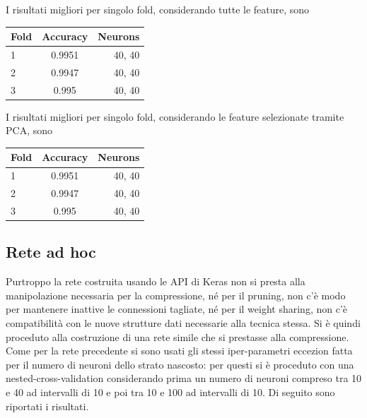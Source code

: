 \documentclass[12pt]{report}
\begin{document}
I risultati migliori per singolo fold, considerando tutte le feature, sono

\par\null\par

\begin{center}
\begin{tabular}{lcr}
\toprule
Fold & Accuracy & Neurons \\
\midrule
1  & 0.9951 & 40, 40\\
2  & 0.9947 & 40, 40\\
3  & 0.995 & 40, 40\\
\bottomrule
\end{tabular}
\end{center}

\par\null\par
\par\null\par

I risultati migliori per singolo fold, considerando le feature selezionate tramite PCA, sono

\par\null\par

\begin{center}
\begin{tabular}{lcr}
\toprule
Fold & Accuracy & Neurons \\
\midrule
1  & 0.9951 & 40, 40\\
2  & 0.9947 & 40, 40\\
3  & 0.995 & 40, 40\\
\bottomrule
\end{tabular}
\end{center}

\par\null\par
\par\null\par

\subsection{Rete ad hoc}
Purtroppo la rete costruita usando le API di Keras non si presta alla manipolazione necessaria per la compressione, né per il pruning, non c’è modo per mantenere inattive le connessioni tagliate, né per il weight sharing, non c’è compatibilità con le nuove strutture dati necessarie alla tecnica stessa.
Si è quindi proceduto alla costruzione di una rete simile che si prestasse alla compressione. Come per la rete precedente si sono usati gli stessi iper-parametri eccezion fatta per il numero di neuroni dello strato nascosto: per questi si è proceduto con una nested-cross-validation considerando prima un numero di neuroni compreso tra 10 e 40 ad intervalli di 10 e poi tra 10 e 100 ad intervalli di 10.
Di seguito sono riportati i risultati.
\end{document}
